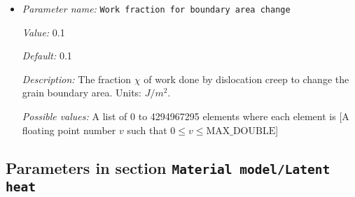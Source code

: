 \begin{itemize}
{\it Value:} 5e24


{\it Default:} 5e24


{\it Description:} The value of the constant viscosity. Units: $kg/m/s$.


{\it Possible values:} A floating point number $v$ such that $0 \leq v \leq \text{MAX\_DOUBLE}$
\item {\it Parameter name:} {\tt Work fraction for boundary area change}
\label{parameters:Material model/Grain size model/Work fraction for boundary area change}
\label{parameters:Material_20model/Grain_20size_20model/Work_20fraction_20for_20boundary_20area_20change}


{\it Value:} 0.1


{\it Default:} 0.1


{\it Description:} The fraction $\chi$ of work done by dislocation creep to change the grain boundary area. Units: $J/m^2$.


{\it Possible values:} A list of 0 to 4294967295 elements where each element is [A floating point number $v$ such that $0 \leq v \leq \text{MAX\_DOUBLE}$]
\end{itemize}

\subsection{Parameters in section \tt Material model/Latent heat}
\label{parameters:Material_20model/Latent_20heat}

